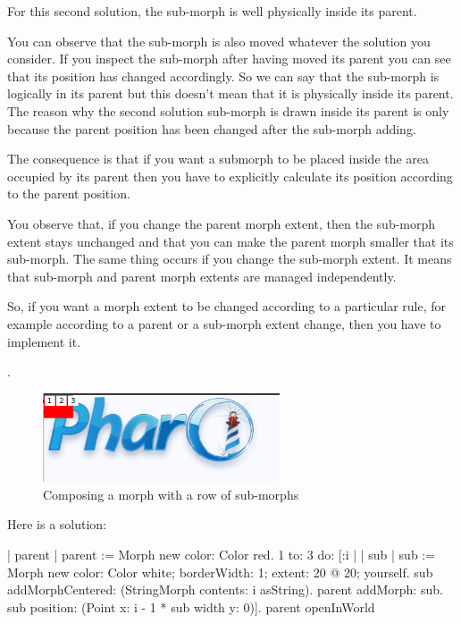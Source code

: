 \documentclass[a4paper,10pt,twoside]{book}
\begin{document}
For this second solution, the sub-morph is well physically inside its parent.


You can observe that the sub-morph is also moved whatever the solution you consider. If you inspect the sub-morph after having moved its parent you can see that its position has changed accordingly. So we can say that the sub-morph is logically in its parent but this doesn't mean that it is physically inside its parent. The reason why the second solution sub-morph is drawn inside its parent is only because the parent position has been changed after the sub-morph adding. 

The consequence is that if you want a submorph to be placed inside the area occupied by its parent then you have to explicitly calculate its position according to the parent position.


You observe that, if you change the parent morph extent, then the sub-morph extent stays unchanged and that you can make the parent morph smaller that its sub-morph. The same thing occurs if you change the sub-morph extent. It means that sub-morph and parent morph extents are managed independently.

So, if you want a morph extent to be changed according to a particular rule, for example according to a parent or a sub-morph extent change, then you have to implement it.

.

\begin{figure}[htbp]
\begin{center}
	\includegraphics[width=7cm]{composingMorph3}
	\caption{Composing a morph with a row of sub-morphs}
\end{center}
\end{figure}
Here is a solution:
\begin{code}
| parent |
parent := Morph new color: Color red.
1 to: 3
 do: [:i | 	| sub |
	sub := Morph new color: Color white; borderWidth: 1; extent: 20 @ 20; yourself.
	sub addMorphCentered: (StringMorph contents: i asString).
	parent addMorph: sub.
	sub position: (Point x: i - 1 * sub width y: 0)].
parent openInWorld
\end{code}
\end{document}
